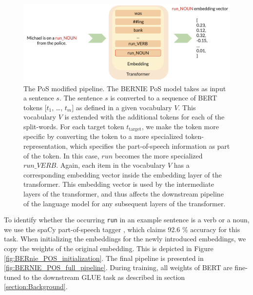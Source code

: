 \documentclass[a4paper,12pt,twoside,openright]{report}
\begin{document}
\begin{figure}
	\center
  \includegraphics[width=\linewidth]{./assets/experiments/pipeline_tokenizer_BERnie_POS_input.png}
  \caption{The PoS modified pipeline. 
  The BERNIE PoS model takes as input a sentence $s$. The sentence $s$ is converted to a sequence of BERT tokens $[t_1$, \ldots, $t_m]$ as defined in a given vocabulary $V$.
    This vocabulary $V$ is extended with the additional tokens for each of the split-words.
For each target token $t_{\text{target}}$, we make the token more specific by converting the token to a more specialized token-representation, which specifies the part-of-speech information as part of the token.
In this case, $run$ becomes the more specialized $run\_ VERB$.
Again, each item in the vocabulary $V$ has a corresponding embedding vector inside the embedding layer of the transformer.
This embedding vector is used by the intermediate layers of the transformer, and thus affects the downstream pipeline of the language model for any subsequent layers of the transformer.
}
  \label{fig:BERnie_POS_pipeline}
\end{figure}


To identify whether the occurring \Verb#run# in an example sentence is a verb or a noun, we use the spaCy part-of-speech tagger \cite{spacyb}, which claims 92.6 \% accuracy for this task.
When initializing the embeddings for the newly introduced embeddings, we copy the weights of the original embedding.
This is depicted in Figure \ref{fig:BERnie_POS_initialization}.
The final pipeline is presented in \ref{fig:BERNIE_POS_full_pipeline}.
During training, all weights of BERT are fine-tuned to the downstream GLUE task as described in section \ref{section:Background}.
\end{document}
